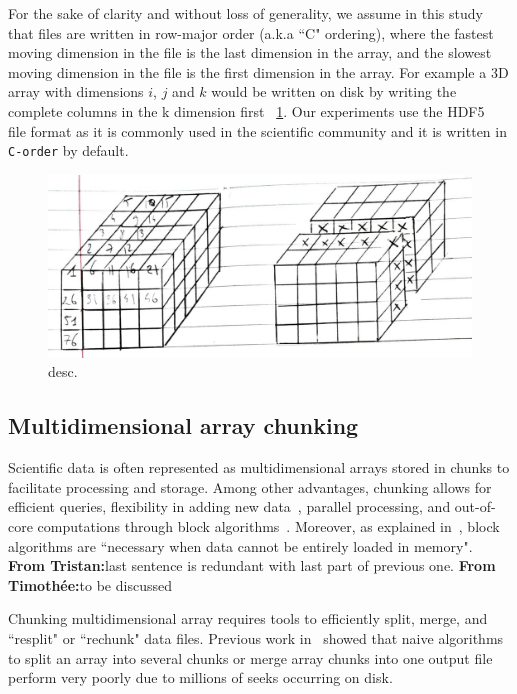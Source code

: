 \documentclass[conference]{IEEEtran}
\newcommand{\tristan}[1]{\color{orange}\textbf{From Tristan:}#1\color{black}}
\newcommand{\timothee}[1]{\color{blue}\textbf{From Timothée:}#1\color{black}}
\begin{document}
For the sake of clarity and without loss of generality,
 we assume in this study that files are written in row-major order (a.k.a
``C" ordering), where the fastest moving dimension in the file is the last
dimension in the array, and the slowest moving dimension in the file is the first
dimension in the array. For example a 3D array with dimensions $i$, $j$ and $k$
would be written on disk by writing the complete columns in the k dimension first
~\ref{fig:seeks_and_rowmajor}.
Our experiments use the HDF5~\cite{hdf5} file format as it is commonly used in the
scientific community and it is written in \texttt{C-order} by default.

\begin{figure}[h]
  \centering
  \includegraphics[scale=0.35]{./figures/new/seeks_and_rowmajor.jpeg}
  \caption{desc.}
  \label{fig:seeks_and_rowmajor}
\end{figure}

\subsection{Multidimensional array chunking}
Scientific data is often represented as multidimensional arrays stored in
chunks to facilitate processing and storage. Among other advantages, chunking
allows for efficient queries, flexibility in adding new
data~\cite{optimal_chuking}, parallel processing, and out-of-core
computations through block algorithms~\cite{matthew_rocklin-proc-scipy-2015}.
Moreover, as explained in~\cite{matthew_rocklin-proc-scipy-2015}, block
algorithms are ``necessary when data cannot be entirely loaded in memory".
\tristan{last sentence is redundant with last part of previous one.}
\timothee{to be discussed}

Chunking multidimensional array requires tools to efficiently split,
merge, and ``resplit" or ``rechunk" data files. Previous work in~\cite{seqalgorithms}
showed that naive algorithms to split an array into several chunks or merge
array chunks into one output file perform very poorly due to millions of seeks
occurring on disk.
\end{document}
